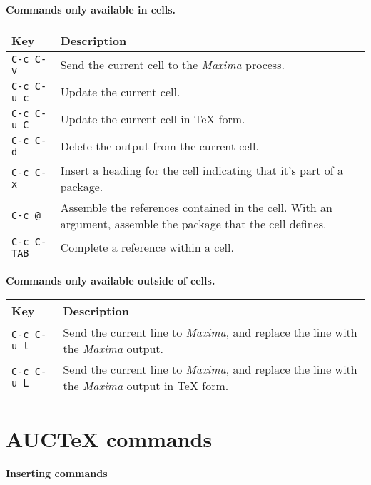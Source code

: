 \documentclass{article}
\newcommand{\mx}{\textsl{\sffamily Maxima}}
\begin{document}
\newpage

\noindent
\textbf{Commands only available in cells.}

\smallskip

\noindent
\begin{tabular}{p{\firstcol}p{\secondcol}}
\hline
\textbf{Key} & \textbf{Description}\\
\hline
\texttt{C-c C-v}
& Send the current cell to the \mx{} process.\\
\texttt{C-c C-u c}
& Update the current cell.\\
\texttt{C-c C-u C}
& Update the current cell in \TeX{} form.\\
\texttt{C-c C-d}
& Delete the output from the current cell.\\
\texttt{C-c C-x}
& Insert a heading for the cell indicating that it's part of a
package. \\
\texttt{C-c @}
& Assemble the references contained in the cell.  With an argument,
assemble the package that the cell defines.\\
\texttt{C-c C-\texttt{TAB}}
& Complete a reference within a cell.
\end{tabular}

\smallskip

\noindent
\textbf{Commands only available outside of cells.}

\smallskip

\noindent
\begin{tabular}{p{\firstcol}p{\secondcol}}
\hline
\textbf{Key} & \textbf{Description}\\
\hline
\texttt{C-c C-u l}
& Send the current line to \mx{}, and replace the line with the
\mx{} output.\\
\texttt{C-c C-u L}
& Send the current line to \mx{}, and replace the line with the
\mx{} output in \TeX{} form.
\end{tabular}


\section{AUC\TeX{} commands}

\smallskip

\noindent
\textbf{Inserting commands}
\end{document}
